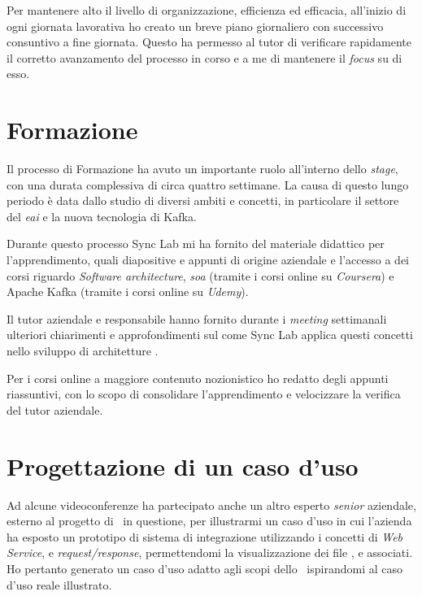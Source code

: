 Per mantenere alto il livello di organizzazione, efficienza ed efficacia, all'inizio di ogni giornata lavorativa ho creato un breve piano giornaliero con successivo consuntivo a fine giornata.
Questo ha permesso al tutor di verificare rapidamente il corretto avanzamento del processo in corso e a me di mantenere il \textit{focus} su di esso.

\section{Formazione}

Il processo di Formazione ha avuto un importante ruolo all'interno dello \textit{stage}, con una durata complessiva di circa quattro settimane.
La causa di questo lungo periodo è data dallo studio di diversi ambiti e concetti, in particolare il settore del \textit{\acrlong{eai}} e la nuova tecnologia di Kafka.

Durante questo processo Sync Lab mi ha fornito del materiale didattico per l'apprendimento, quali diapositive e appunti di origine aziendale e l'accesso a dei corsi riguardo \textit{Software architecture}, \textit{\acrlong{soa}} (tramite i corsi online su \textit{Coursera}) e Apache Kafka (tramite i corsi online su \textit{Udemy}).

Il tutor aziendale e responsabile  hanno fornito durante i \textit{meeting} settimanali ulteriori chiarimenti e approfondimenti sul come Sync Lab applica questi concetti nello sviluppo di architetture \software.

Per i corsi online a maggiore contenuto nozionistico ho redatto degli appunti riassuntivi, con lo scopo di consolidare l'apprendimento e velocizzare la verifica del tutor aziendale.

\section{Progettazione di un caso d'uso}

Ad alcune videoconferenze ha partecipato anche un altro esperto \textit{senior} aziendale, esterno al progetto di \stage\ in questione, per illustrarmi un caso d'uso in cui l'azienda ha esposto un prototipo di sistema di integrazione utilizzando i concetti di \textit{Web Service},  e \textit{request/response}, permettendomi la visualizzazione dei file ,  e  associati.
Ho pertanto generato un caso d'uso adatto agli scopi dello \stage\ ispirandomi al caso d'uso reale illustrato.

